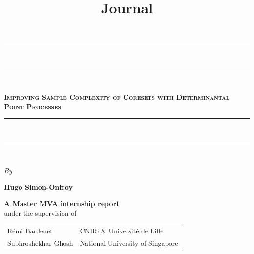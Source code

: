 \documentclass{report} %
\newcommand{\1}{\mathds{1}} %
\theoremstyle{definition} %
\begin{document}
    \title{Journal}

\begin{titlepage}
    \begin{center}
        \vspace*{25pt} {
        \begin{spacing}{0.05}
            \rule{400pt}{2pt}\\
            \rule{400pt}{0.75pt}\\
        \end{spacing}
        \vspace{20pt}
        \begin{spacing}{0.9}
            \fontsize{23.6pt}{26pt}\selectfont%
            \textsc{\textbf{Improving Sample Complexity of Coresets with Determinantal Point Processes}}\\%
        \end{spacing}
        \vspace{5pt}
        \begin{spacing}{0.05}
            \rule{400pt}{0.75pt}\\
            \rule{400pt}{2pt}\\
        \end{spacing}
        }
    
        \vspace*{1cm}
        \begin{large}
        \textit{By}\\%
        \end{large}
    
    
        \vspace*{4pt}
        \begin{Large}
        \textbf{Hugo Simon-Onfroy}\\%
        \end{Large}
    
    \begin{large}
        \vspace*{5cm}
        \textbf{
        A Master MVA internship report }
        \vspace*{6pt}\\
        under the supervision of
        \vspace*{20pt}\\
    
        \begin{longtable*}{ p{0.4\textwidth} p{0.5\textwidth} }
            R\'emi Bardenet & CNRS \& Université de Lille
            \tabularnewline Subhroshekhar Ghosh & National University of Singapore
            \tabularnewline
        \end{longtable*}
    \end{large}
    

\end{center}
\end{titlepage}
\end{document}
